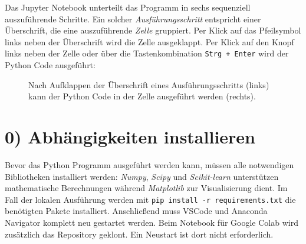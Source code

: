 Das Jupyter Notebook unterteilt das Programm in sechs sequenziell auszuführende Schritte. Ein solcher \textit{Ausführungsschritt} entspricht einer Überschrift, die eine auszuführende \textit{Zelle} gruppiert. Per Klick auf das Pfeilsymbol links neben der Überschrift wird die Zelle ausgeklappt. Per Klick auf den Knopf links neben der Zelle oder über die Tastenkombination \texttt{Strg + Enter} wird der Python Code ausgeführt:
\begin{figure}[H]
	\centering
	\footnotesize
	\centerline{}
	\caption{Nach Aufklappen der Überschrift eines Ausführungsschritts (links) kann der Python Code in der Zelle ausgeführt werden (rechts).}
\end{figure}

\section*{0) Abhängigkeiten installieren}
Bevor das Python Programm ausgeführt werden kann, müssen alle notwendigen Bibliotheken installiert werden: \textit{Numpy}, \textit{Scipy} und \textit{Scikit-learn} unterstützen mathematische Berechnungen während \textit{Matplotlib} zur Visualisierung dient. Im Fall der lokalen Ausführung werden mit \texttt{pip install -r requirements.txt} die benötigten Pakete installiert. Anschließend muss VSCode und Anaconda Navigator komplett neu gestartet werden. Beim Notebook für Google Colab wird zusätzlich das Repository geklont. Ein Neustart ist dort nicht erforderlich.

